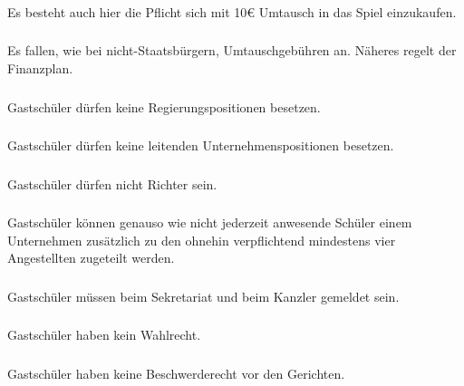 \documentclass[a4paper, 11pt]{report}
\begin{document}
\subsubsection{}
Es besteht auch hier die Pflicht sich mit 10€ Umtausch in das Spiel einzukaufen.  

\subsubsection{}
Es fallen, wie bei nicht-Staatsbürgern, Umtauschgebühren an. Näheres regelt der Finanzplan.

\subsubsection{}
Gastschüler dürfen keine Regierungspositionen besetzen. 

\subsubsection{}
Gastschüler dürfen keine leitenden Unternehmenspositionen besetzen. 

\subsubsection{}
Gastschüler dürfen nicht Richter sein. 

\subsubsection{}
Gastschüler können genauso wie nicht jederzeit anwesende Schüler einem Unternehmen zusätzlich zu den ohnehin verpflichtend mindestens vier Angestellten zugeteilt werden. 
    
\subsubsection{}
Gastschüler müssen beim Sekretariat und beim Kanzler gemeldet sein.

\subsubsection{}
Gastschüler haben kein Wahlrecht. 

\subsubsection{}
Gastschüler haben keine Beschwerderecht vor den Gerichten.
\end{document}
